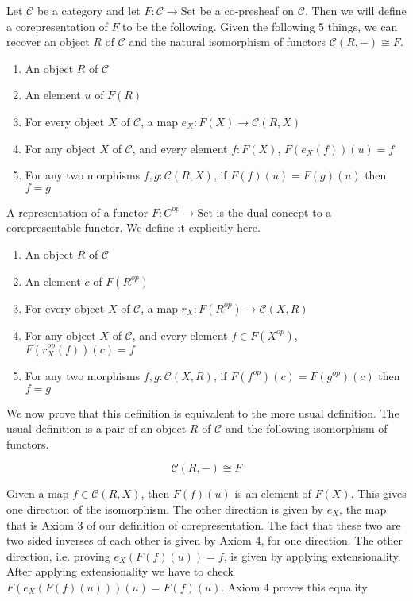 \documentclass[12pt]{article} %
\theoremstyle{definition}
\theoremstyle{definition}
\theoremstyle{definition}
\theoremstyle{definition}
\begin{document}
Let $\mathcal{C}$ be a category and let $F : \mathcal{C} \to \text{Set}$
be a co-presheaf on $\mathcal{C}$. Then we will define a corepresentation of
$F$ to be the following. Given the following 5 things, we can recover an
object $R$ of $\mathcal{C}$ and the natural isomorphism 
of functors $\mathcal{C}(R, -) \cong F$.

\begin{enumerate}
  \item An object $R$ of $\mathcal{C}$
  \item An element $u$ of $F(R)$
  \item For every object $X$ of $\mathcal{C}$, a map $e_X : F(X) \to \mathcal{C}(R, X)$
  \item For any object $X$ of $\mathcal{C}$, and every element $f : F(X)$, $F(e_X(f))(u) = f$
  \item For any two morphisms $f, g : \mathcal{C}(R, X)$, if $F(f)(u) = F(g)(u)$ then $f = g$
\end{enumerate}

A representation of a functor $F : C^{op} \to \text{Set}$ is the dual concept to a corepresentable
functor. We define it explicitly here.

\begin{enumerate}
  \item An object $R$ of $\mathcal{C}$
  \item An element $c$ of $F(R^{op})$
  \item For every object $X$ of $\mathcal{C}$, a map $r_X : F(R^{op}) \to \mathcal{C}(X, R)$
  \item For any object $X$ of $\mathcal{C}$, and every element $f \in F(X^{op})$, $F(r_X^{op}(f))(c) = f$
  \item For any two morphisms $f, g : \mathcal{C}(X, R)$, if $F(f^{op})(c) = F(g^{op})(c)$ then $f = g$
\end{enumerate}

We now prove that this definition is equivalent to the more usual definition.
The usual definition is a pair of an object $R$ of $\mathcal{C}$ and 
the following isomorphism of functors.

\begin{equation}
\mathcal{C}(R, -) \cong F
\end{equation}

Given a map $f \in \mathcal{C}(R, X)$, then $F(f)(u)$ is an element of $F(X)$. This gives one 
direction of the isomorphism. The other direction is given by $e_X$, the map that is
Axiom 3 of our definition of corepresentation. The fact that these two are two sided inverses
of each other is given by Axiom 4, for one direction. The other direction, i.e.
proving $e_X(F(f)(u)) = f$, is given by applying extensionality.
After applying extensionality we have to check $F(e_X(F(f)(u)))(u) = F(f)(u)$. 
Axiom 4 proves this equality
\end{document}
